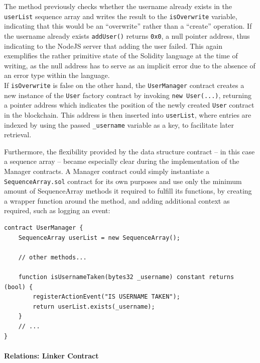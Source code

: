 The method previously checks whether the username already exists in the
\texttt{userList} sequence array and writes the result to the
\texttt{isOverwrite} variable, indicating that this would be an
``overwrite'' rather than a ``create'' operation. If the username
already exists \texttt{addUser()} returns \texttt{0x0}, a null pointer
address, thus indicating to the NodeJS server that adding the user
failed. This again exemplifies the rather primitive state of the
Solidity language at the time of writing, as the null address has to
serve as an implicit error due to the absence of an error type within
the language.\\
If \texttt{isOverwrite} is false on the other hand, the
\texttt{UserManager} contract creates a new instance of the
\texttt{User} factory contract by invoking \texttt{new\ User(...)},
returning a pointer address which indicates the position of the newly
created \texttt{User} contract in the blockchain. This address is then
inserted into \texttt{userList}, where entries are indexed by using the
passed \texttt{\_username} variable as a key, to facilitate later
retrieval.

Furthermore, the flexibility provided by the data structure contract --
in this case a sequence array -- became especially clear during the
implementation of the Manager contracts. A Manager contract could simply
instantiate a \texttt{SequenceArray.sol} contract for its own purposes
and use only the minimum amount of SequenceArray methods it required to
fulfill its functions, by creating a wrapper function around the method,
and adding additional context as required, such as logging an event:

\begin{verbatim}
contract UserManager {
    SequenceArray userList = new SequenceArray();

    // other methods...

    function isUsernameTaken(bytes32 _username) constant returns (bool) {
        registerActionEvent("IS USERNAME TAKEN");
        return userList.exists(_username);
    }
    // ...
}
\end{verbatim}

\paragraph{Relations: Linker Contract}\label{relations-linker-contract}

